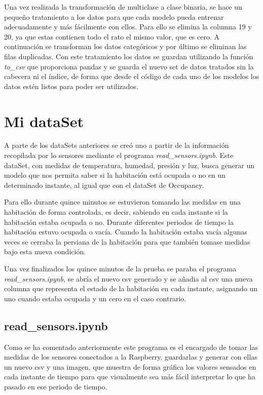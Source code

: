 \documentclass[a4paper, 12pt]{book}
\begin{document}
Una vez realizada la transformación de multiclase a clase binaria, se hace un pequeño tratamiento a los datos para que cada modelo pueda entrenar adecuadamente y más fácilmente con ellos\cite{dataSetTreatment}. Para ello se elimina la columna 19 y 20, ya que estas contienen todo el rato el mismo valor, que es cero. A continuación se transforman los datos categóricos y por último se eliminan las filas duplicadas. Con este tratamiento los datos se guardan utilizando la función \textit{to\_csv} que proporciona pandas y se guarda el nuevo set de datos tratados sin la cabecera ni el índice, de forma que desde el código de cada uno de los modelos los datos estén listos para poder ser utilizados.

\section{Mi dataSet}
\label{sec:mi_dataSet}

A parte de los dataSets anteriores se creó uno a partir de la información recopilada por lo sensores mediante el programa \textit{read\_sensors.ipynb}. Este dataSet, con medidas de temperatura, humedad, presión y luz, busca generar un modelo que nos permita saber si la habitación está ocupada o no en un determinado instante, al igual que con el dataSet de Occupancy. 

Para ello durante quince minutos se estuvieron tomando las medidas en una habitación de forma controlada, es decir, sabiendo en cada instante si la habitación estaba ocupada o no. Durante diferentes periodos de tiempo la habitación estuvo ocupada o vacía. Cuando la habitación estaba vacía algunas veces se cerraba la persiana de la habitación para que también tomase medidas bajo esta nueva condición.

Una vez finalizados los quince minutos de la prueba se paraba el programa \textit{read\_sensors.ipynb}, se abría el nuevo csv generado y se añadia al csv una nueva columna que representa el estado de la habitación en cada instante, asignando un uno cuando estaba ocupada y un cero en el caso contrario.

\subsection{read\_sensors.ipynb}
\label{subsec_read_sensors}

Como se ha comentado anteriormente este programa es el encargado de tomar las medidas de los sensores conectados a la Raspberry, guardarlas y generar con ellas un nuevo csv y una imagen, que muestra de forma gráfica los valores sensados en cada instante de tiempo para que visualmente sea más fácil interpretar lo que ha pasado en ese periodo de tiempo. 
\end{document}
